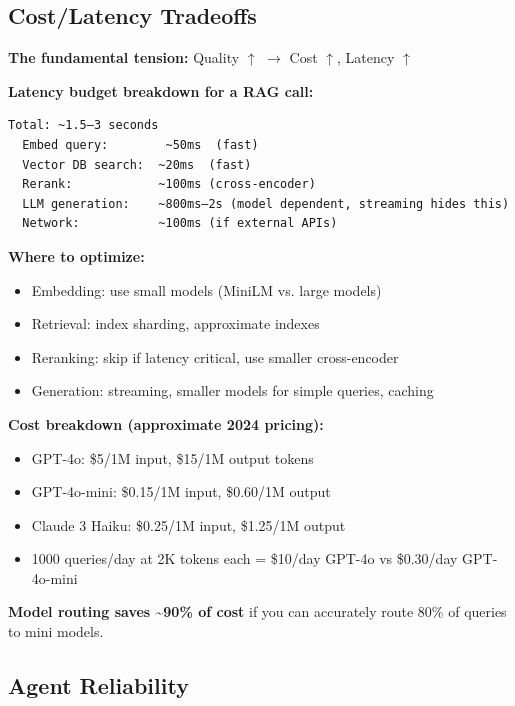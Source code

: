 \documentclass[11pt]{article}
\providecommand{\tightlist}{\setlength{\itemsep}{1pt}\setlength{\parskip}{0pt}}
\begin{document}
\subsection{Cost/Latency Tradeoffs}\label{costlatency-tradeoffs}

\textbf{The fundamental tension:} Quality \(\uparrow\) \(\rightarrow\) Cost \(\uparrow\), Latency \(\uparrow\)

\textbf{Latency budget breakdown for a RAG call:}

\setcodelang{}

\begin{verbatim}
Total: ~1.5–3 seconds
  Embed query:        ~50ms  (fast)
  Vector DB search:  ~20ms  (fast)
  Rerank:            ~100ms (cross-encoder)
  LLM generation:    ~800ms–2s (model dependent, streaming hides this)
  Network:           ~100ms (if external APIs)
\end{verbatim}

\textbf{Where to optimize:}

\begin{itemize}
\tightlist
\item
  Embedding: use small models (MiniLM vs. large models)
\item
  Retrieval: index sharding, approximate indexes
\item
  Reranking: skip if latency critical, use smaller cross-encoder
\item
  Generation: streaming, smaller models for simple queries, caching
\end{itemize}

\textbf{Cost breakdown (approximate 2024 pricing):}

\begin{itemize}
\tightlist
\item
  GPT-4o: \$5/1M input, \$15/1M output tokens
\item
  GPT-4o-mini: \$0.15/1M input, \$0.60/1M output
\item
  Claude 3 Haiku: \$0.25/1M input, \$1.25/1M output
\item
  1000 queries/day at 2K tokens each = \$10/day GPT-4o vs \$0.30/day GPT-4o-mini
\end{itemize}

\textbf{Model routing saves \textasciitilde90\% of cost} if you can accurately route 80\% of queries to mini models.

\subsection{Agent Reliability}\label{agent-reliability}
\end{document}
